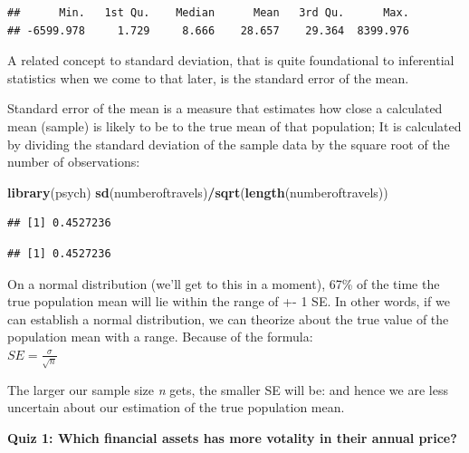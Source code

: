 \documentclass[]{article}
\newenvironment{Shaded}{\begin{snugshade}}{\end{snugshade}}
\newcommand{\KeywordTok}[1]{\textcolor[rgb]{0.13,0.29,0.53}{\textbf{#1}}}
\newcommand{\NormalTok}[1]{#1}
\newcommand{\OperatorTok}[1]{\textcolor[rgb]{0.81,0.36,0.00}{\textbf{#1}}}
\begin{document}
\begin{verbatim}
##      Min.   1st Qu.    Median      Mean   3rd Qu.      Max. 
## -6599.978     1.729     8.666    28.657    29.364  8399.976
\end{verbatim}

A related concept to standard deviation, that is quite foundational to
inferential statistics when we come to that later, is the standard error
of the mean.

Standard error of the mean is a measure that estimates how close a
calculated mean (sample) is likely to be to the true mean of that
population; It is calculated by dividing the standard deviation of the
sample data by the square root of the number of observations:

\begin{Shaded}
\begin{Highlighting}[]
\KeywordTok{library}\NormalTok{(psych)}
\KeywordTok{sd}\NormalTok{(numberoftravels)}\OperatorTok{/}\KeywordTok{sqrt}\NormalTok{(}\KeywordTok{length}\NormalTok{(numberoftravels))}
\end{Highlighting}
\end{Shaded}

\begin{verbatim}
## [1] 0.4527236
\end{verbatim}

\begin{Shaded}
\end{Shaded}

\begin{verbatim}
## [1] 0.4527236
\end{verbatim}

On a normal distribution (we'll get to this in a moment), 67\% of the
time the true population mean will lie within the range of +- 1 SE. In
other words, if we can establish a normal distribution, we can theorize
about the true value of the population mean with a range. Because of the
formula:\\
\(SE = \frac{\sigma}{\sqrt{n}}\)

The larger our sample size \emph{n} gets, the smaller SE will be: and
hence we are less uncertain about our estimation of the true population
mean.

\textbf{Quiz 1: Which financial assets has more votality in their annual
price?}
\end{document}
